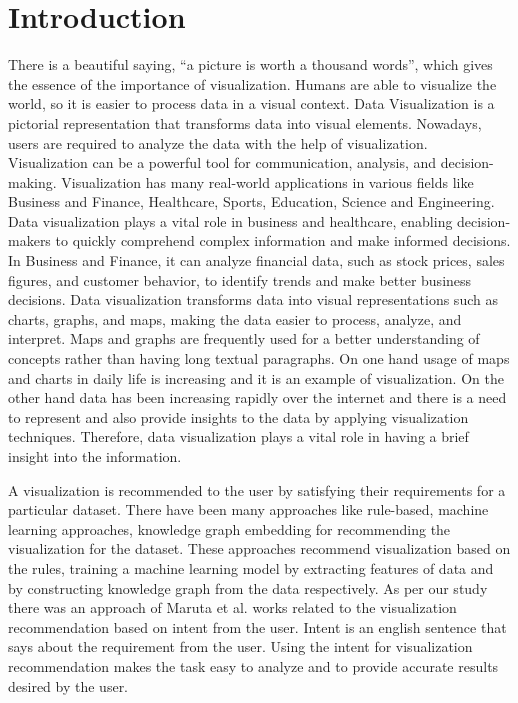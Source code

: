 \chapter{Introduction}

There is a beautiful saying, ``a picture is worth a thousand words'', which gives the essence of the importance of visualization. Humans are able to visualize the world, so it is easier to process data in a visual context. Data Visualization is a pictorial representation that transforms data into visual elements. Nowadays, users are required to analyze the data with the help of visualization. Visualization can be a powerful tool for communication, analysis, and decision-making. Visualization has many real-world applications in various fields like Business and Finance, Healthcare, Sports, Education, Science and Engineering. Data visualization plays a vital role in business and healthcare, enabling decision-makers to quickly comprehend complex information and make informed decisions. In Business and Finance, it can analyze financial data, such as stock prices, sales figures, and customer behavior, to identify trends and make better business decisions. Data visualization transforms data into visual representations such as charts, graphs, and maps, making the data easier to process, analyze, and interpret. Maps and graphs are frequently used for a better understanding of concepts rather than having long textual paragraphs. On one hand usage of maps and charts in daily life is increasing and it is an example of visualization. On the other hand data has been increasing rapidly over the internet and there is a need to represent and also provide insights to the data by applying visualization techniques. Therefore, data visualization plays a vital role in having a brief insight into the information.

A visualization is recommended to the user by satisfying their requirements for a particular dataset. There have been many approaches like rule-based, machine learning approaches, knowledge graph embedding  for recommending the visualization for the dataset. These approaches recommend visualization based on the rules, training a machine learning model by extracting features of data and by constructing knowledge graph from the data respectively. As per our study there was an approach of Maruta et al. \cite{maruta2021intent} works related to the visualization recommendation based on intent from the user. Intent is an english sentence that says about the requirement from the user. Using the intent for visualization recommendation makes the task easy to analyze and to provide accurate results desired by the user. 

